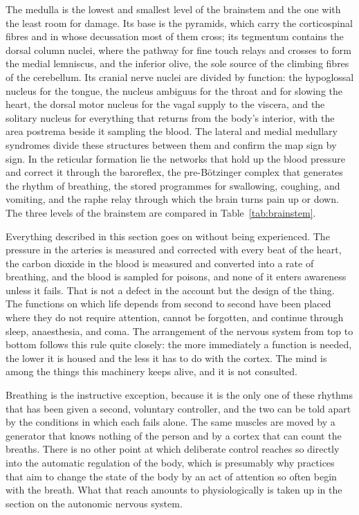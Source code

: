 \documentclass[11pt]{article}
\begin{document}
The medulla is the lowest and smallest level of the brainstem and the one with the least room for damage. Its base is the pyramids, which carry the corticospinal fibres and in whose decussation most of them cross; its tegmentum contains the dorsal column nuclei, where the pathway for fine touch relays and crosses to form the medial lemniscus, and the inferior olive, the sole source of the climbing fibres of the cerebellum. Its cranial nerve nuclei are divided by function: the hypoglossal nucleus for the tongue, the nucleus ambiguus for the throat and for slowing the heart, the dorsal motor nucleus for the vagal supply to the viscera, and the solitary nucleus for everything that returns from the body's interior, with the area postrema beside it sampling the blood. The lateral and medial medullary syndromes divide these structures between them and confirm the map sign by sign. In the reticular formation lie the networks that hold up the blood pressure and correct it through the baroreflex, the pre-B\"otzinger complex that generates the rhythm of breathing, the stored programmes for swallowing, coughing, and vomiting, and the raphe relay through which the brain turns pain up or down. The three levels of the brainstem are compared in Table~\ref{tab:brainstem}.

Everything described in this section goes on without being experienced. The pressure in the arteries is measured and corrected with every beat of the heart, the carbon dioxide in the blood is measured and converted into a rate of breathing, and the blood is sampled for poisons, and none of it enters awareness unless it fails. That is not a defect in the account but the design of the thing. The functions on which life depends from second to second have been placed where they do not require attention, cannot be forgotten, and continue through sleep, anaesthesia, and coma. The arrangement of the nervous system from top to bottom follows this rule quite closely: the more immediately a function is needed, the lower it is housed and the less it has to do with the cortex. The mind is among the things this machinery keeps alive, and it is not consulted.

Breathing is the instructive exception, because it is the only one of these rhythms that has been given a second, voluntary controller, and the two can be told apart by the conditions in which each fails alone. The same muscles are moved by a generator that knows nothing of the person and by a cortex that can count the breaths. There is no other point at which deliberate control reaches so directly into the automatic regulation of the body, which is presumably why practices that aim to change the state of the body by an act of attention so often begin with the breath. What that reach amounts to physiologically is taken up in the section on the autonomic nervous system.
\end{document}
